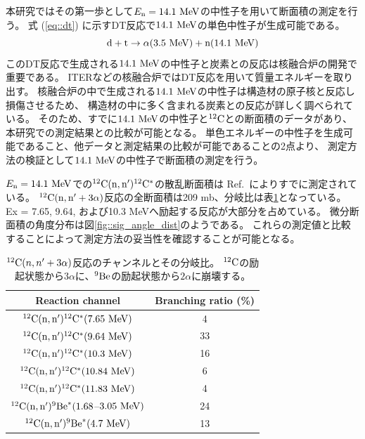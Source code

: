 本研究ではその第一歩として$E_{\rm n} = 14.1~{\rm MeV}$の中性子を用いて断面積の測定を行う。
式 (\ref{eq::dt}) に示すDT反応で$14.1~{\rm MeV}$の単色中性子が生成可能である。
\begin{equation}
  {\rm d} + {\rm t} \rightarrow \alpha (3.5~{\rm MeV}) + {\rm n} (14.1~{\rm MeV})
  \label{eq::dt}
\end{equation}
このDT反応で生成される$14.1~{\rm MeV}$の中性子と炭素との反応は核融合炉の開発で重要である。
ITERなどの核融合炉ではDT反応を用いて質量エネルギーを取り出す。
核融合炉の中で生成される$14.1~{\rm MeV}$の中性子は構造材の原子核と反応し損傷させるため、
構造材の中に多く含まれる炭素との反応が詳しく調べられている。
そのため、すでに$14.1~{\rm MeV}$の中性子と${}^{12}{\rm C}$との断面積のデータがあり、本研究での測定結果との比較が可能となる。
単色エネルギーの中性子を生成可能であること、他データと測定結果の比較が可能であることの2点より、
測定方法の検証として$14.1~{\rm MeV}$の中性子で断面積の測定を行う。

$E_{\rm n}=14.1~{\rm MeV}$での${}^{12}{\rm C}({\rm n},{\rm n}'){}^{12}{\rm C}^{*}$の散乱断面積は
Ref.~\cite{takahashietal,kondoetal}によりすでに測定されている。
${}^{12}{\rm C}({\rm n},{\rm n}'+3\alpha)$反応の全断面積は209 mb、分岐比は表\ref{tab::branchingratio}となっている。
Ex = 7.65, 9.64, および10.3 MeVへ励起する反応が大部分を占めている。
微分断面積の角度分布は図\ref{fig::sig_angle_dist}のようである。
これらの測定値と比較することによって測定方法の妥当性を確認することが可能となる。

\begin{table}
  \centering
  \caption[${}^{12}{\rm C}(n,n'+3\alpha)$反応のチャンネルとその分岐比。]
          {${}^{12}{\rm C}(n,n'+3\alpha)$反応のチャンネルとその分岐比。
  ${}^{12}{\rm C}$の励起状態から$3\alpha$に、${}^{9}{\rm Be}$の励起状態から$2\alpha$に崩壊する。}
  \label{tab::branchingratio}
  \begin{tabular}{cc}
    \toprule
    Reaction channel & Branching ratio (\%)\\
    \midrule
    ${}^{12}{\rm C}({\rm n},{\rm n}'){}^{12}{\rm C}^{*}(7.65~{\rm MeV})$ & 4\\
    ${}^{12}{\rm C}({\rm n},{\rm n}'){}^{12}{\rm C}^{*}(9.64~{\rm MeV})$ & 33\\
    ${}^{12}{\rm C}({\rm n},{\rm n}'){}^{12}{\rm C}^{*}(10.3~{\rm MeV})$ & 16\\
    ${}^{12}{\rm C}({\rm n},{\rm n}'){}^{12}{\rm C}^{*}(10.84~{\rm MeV})$ & 6\\
    ${}^{12}{\rm C}({\rm n},{\rm n}'){}^{12}{\rm C}^{*}(11.83~{\rm MeV})$ & 4\\
    ${}^{12}{\rm C}({\rm n},{\rm n}'){}^{9}{\rm Be}^{*}(1.68$--$3.05~{\rm MeV})$ & 24\\
    ${}^{12}{\rm C}({\rm n},{\rm n}'){}^{9}{\rm Be}^{*}(4.7~{\rm MeV})$ & 13\\
    \bottomrule
  \end{tabular}
\end{table}


